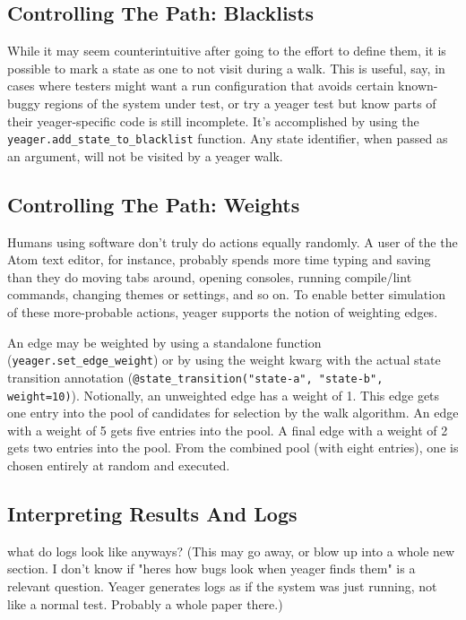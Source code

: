 \subsection{Controlling The Path: Blacklists}
While it may seem counterintuitive after going to the effort to define them, it is possible to mark a state as one to not visit during a walk. This is useful, say, in cases where testers might want a run configuration that avoids certain known-buggy regions of the system under test, or try a yeager test but know parts of their yeager-specific code is still incomplete. It's accomplished by using the \texttt{yeager.add\_state\_to\_blacklist} function. Any state identifier, when passed as an argument, will not be visited by a yeager walk.

\subsection{Controlling The Path: Weights}
Humans using software don't truly do actions equally randomly. A user of the the Atom text editor, for instance, probably spends more time typing and saving than they do moving tabs around, opening consoles, running compile/lint commands, changing themes or settings, and so on. To enable better simulation of these more-probable actions, yeager supports the notion of weighting edges.

An edge may be weighted by using a standalone function (\texttt{yeager.set\_edge\_weight}) or by using the weight kwarg with the actual state transition annotation (\texttt{@state\_transition("state-a", "state-b", weight=10)}). Notionally, an unweighted edge has a weight of 1. This edge gets one entry into the pool of candidates for selection by the walk algorithm. An edge with a weight of 5 gets five entries into the pool. A final edge with a weight of 2 gets two entries into the pool. From the combined pool (with eight entries), one is chosen entirely at random and executed.


\subsection{Interpreting Results And Logs}
what do logs look like anyways? (This may go away, or blow up into a whole new section. I don't know if "heres how bugs look when yeager finds them" is a relevant question. Yeager generates logs as if the system was just running, not like a normal test. Probably a whole paper there.)%
